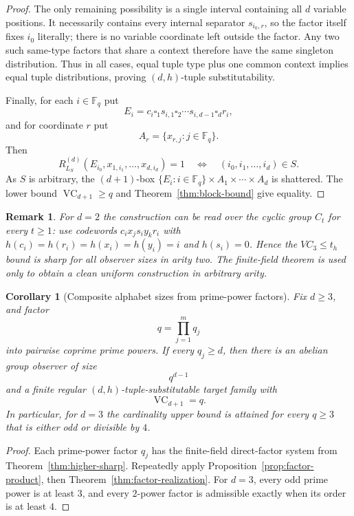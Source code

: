 \documentclass[11pt]{article}
\newtheorem{corollary}[theorem]{Corollary}
\newtheorem{remark}[theorem]{Remark}
\newcommand{\VC}{\operatorname{VC}}
\newcommand{\blank}{\square}
\begin{document}
\begin{proof}
The only remaining possibility is a single interval containing all \(d\)
variable positions. It necessarily contains every internal separator
\(s_{i_0,r}\), so the factor itself fixes \(i_0\) literally; there is no variable
coordinate left outside the factor. Any two such same-type factors that
share a context therefore have the same singleton distribution. Thus in all
cases, equal tuple type plus one common context implies equal tuple
distributions, proving \((d,h)\)-tuple substitutability.

Finally, for each \(i\in\mathbb F_q\) put
\[
E_i=c_i\blank_1s_{i,1}\blank_2\cdots
s_{i,d-1}\blank_dr_i,
\]
and for coordinate \(r\) put
\[
A_r=\{x_{r,j}:j\in\mathbb F_q\}.
\]
Then
\[
R_{L_S}^{(d)}(E_{i_0},x_{1,i_1},\ldots,x_{d,i_d})=1
\quad\Longleftrightarrow\quad
(i_0,i_1,\ldots,i_d)\in S.
\]
As \(S\) is arbitrary, the \((d+1)\)-box
\(\{E_i:i\in\mathbb F_q\}\times A_1\times\cdots\times A_d\) is shattered.
The lower bound \(\VC_{d+1}\ge q\) and
Theorem~\ref{thm:block-bound} give equality.
\end{proof}

\begin{remark}
For \(d=2\) the construction can be read over the cyclic group \(C_t\) for every
\(t\ge1\): use codewords \(c_i x_j s_i y_k r_i\) with
\(h(c_i)=h(r_i)=h(x_i)=h(y_i)=i\) and \(h(s_i)=0\). Hence the \(VC_3\le t_h\)
bound is sharp for all observer sizes in arity two. The finite-field theorem
is used only to obtain a clean uniform construction in arbitrary arity.
\end{remark}


\begin{corollary}[Composite alphabet sizes from prime-power factors]
\label{cor:composite-sharp}
Fix \(d\ge3\), and factor
\[
 q=\prod_{j=1}^m q_j
\]
into pairwise coprime prime powers.  If every \(q_j\ge d\), then there is an
abelian group observer of size
\[
 q^{d-1}
\]
and a finite regular \((d,h)\)-tuple-substitutable target family with
\[
 \VC_{d+1}=q.
\]
In particular, for \(d=3\) the cardinality upper bound is attained for every
\(q\ge3\) that is either odd or divisible by \(4\).
\end{corollary}

\begin{proof}
Each prime-power factor \(q_j\) has the finite-field direct-factor system
from Theorem~\ref{thm:higher-sharp}.  Repeatedly apply
Proposition~\ref{prop:factor-product}, then
Theorem~\ref{thm:factor-realization}.  For \(d=3\), every odd prime power is
at least \(3\), and every \(2\)-power factor is admissible exactly when its
order is at least \(4\).
\end{proof}
\end{document}

